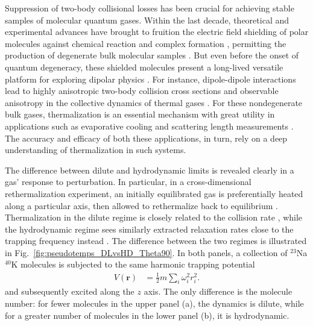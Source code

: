 \documentclass[reprint, amsmath, amssymb, aps, superscriptaddress]{revtex4-1}
\begin{document}
Suppression of two-body collisional losses has been crucial for achieving stable samples of molecular quantum gases.  
Within the last decade, theoretical and experimental advances have brought to fruition the electric field shielding of polar molecules against chemical reaction and complex formation \cite{Karman18_PRL, Karman20_PRA, Anderegg21_Sci, Bigagli23_arxiv, Quemener16_PRA, Gonzalez17_PRA, Matsuda20_Sci, Li21_Nat, Lassabliere22_PRA, Bigagli23_arxiv, Lin23_arxiv}, permitting the production of degenerate bulk molecular samples \cite{Valtolina20_Nat, Schindewolf22_Nat}. 
But even before the onset of quantum degeneracy, these shielded molecules present a long-lived versatile platform for exploring dipolar physics \cite{Baranov08_PR, Lahaye09_IOP, Chomaz22_IOP}. For instance, dipole-dipole interactions lead to highly anisotropic two-body collision cross sections \cite{Bohn14_PRA} and observable anisotropy in the collective dynamics of thermal gases \cite{Aikawa14_PRL, Tang16_PRL, Sykes15_PRA, Wang20_PRA, Wang21_PRA}. 
For these nondegenerate bulk gases, thermalization is an essential mechanism with great utility in applications such as evaporative cooling \cite{Anderson95_Sci, Davis95_PRL, DeMarco99_Sci, Thomas03_JOB, Griesmaier05_PRL, Lu11_PRL, Aikawa12_PRL, Marco19_Sci} and scattering length measurements \cite{Monroe93_PRL, Newbury95_PRA, Schmidt03_PRL, Tang15_PRA, Patscheider21_PRA}. 
The accuracy and efficacy of both these applications, in turn, rely on a deep understanding of thermalization in such systems.



The difference between dilute and hydrodynamic limits is revealed clearly in a gas' response to perturbation.  In particular, in a cross-dimensional rethermalization experiment, an initially equilibrated gas is preferentially heated along a particular axis, then allowed to rethermalize back to equilibrium \cite{Monroe93_PRL}. 
Thermalization in the dilute regime is closely related to the collision rate \cite{Monroe93_PRL, Guery99_PRA, Wang21_PRA}, while the hydrodynamic regime sees similarly extracted relaxation rates close to the trapping frequency instead \cite{Ma03_JPB, Thomas03_JOB, Schindewolf22_Nat}. 
The difference between the two regimes is illustrated in  Fig.~\ref{fig:pseudotemps_DLvsHD_Theta90}.  In both panels, a collection of $^{23}$Na$^{40}$K molecules is subjected to the same harmonic trapping potential
\begin{align} \label{eq:total_potential}
    V(\boldsymbol{r}) 
    &
    = \frac{1}{2} m
    \sum_i \omega_i^2 r_i^2.
\end{align}
and subsequently excited along the $z$ axis.  The only difference is the molecule number: for fewer molecules in the upper panel (a), the dynamics is dilute, while for a greater number of molecules in the lower panel (b), it is hydrodynamic.
\end{document}
